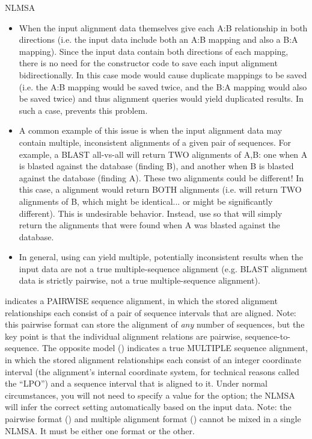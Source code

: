 \documentclass{howto}
\begin{document}
\begin{funcdesc}{NLMSA}
\begin{itemize}
\item When the input alignment data themselves give each A:B relationship in
both directions (i.e. the input data include both an A:B mapping and also a
B:A mapping).  Since the input data contain both directions of each mapping,
there is no need for the constructor code to save each input alignment
bidirectionally.  In this case  mode would cause duplicate
mappings to be saved (i.e. the A:B mapping would be saved twice, and the B:A mapping
would also be saved twice) and thus alignment queries would yield duplicated results.
In such a case,  prevents this problem.

\item A common example of this issue is when the
input alignment data may contain multiple, inconsistent alignments of
a given pair of sequences.  For example, a BLAST all-vs-all will return TWO alignments
of A,B: one when A is blasted against the database (finding B), and another when 
B is blasted against the database (finding A).  These two alignments could be different!
In this case, a  alignment would return BOTH alignments
(i.e.  will return TWO alignments of B, which might be identical...
or might be significantly different).  This is undesirable behavior.  Instead,
use  so that  will simply return the 
alignments that were found when A was blasted against the database.

\item In general, using  can yield multiple, potentially
inconsistent results when the input data are not a true multiple-sequence alignment
(e.g. BLAST alignment data is strictly pairwise, not a true multiple-sequence alignment).
\end{itemize}

   indicates a PAIRWISE sequence alignment, in which
  the stored alignment relationships each consist of a pair of sequence intervals
  that are aligned.  Note: this pairwise format can store the alignment of {\em any}
  number of sequences, but the key point is that the individual alignment relations
  are pairwise, sequence-to-sequence.  The opposite model ()
  indicates a true MULTIPLE sequence alignment, in which the stored alignment
  relationships each consist of an integer coordinate interval (the alignment's internal
  coordinate system, for technical reasons called the ``LPO'') and a sequence
  interval that is aligned to it.  Under normal circumstances, you will not need
  to specify a value for the  option; the NLMSA will infer
  the correct setting automatically based on the input data.  Note: the pairwise format
  () and multiple alignment format ()
  cannot be mixed in a single NLMSA.  It must be either one format or the other.


\end{funcdesc}
\end{document}
